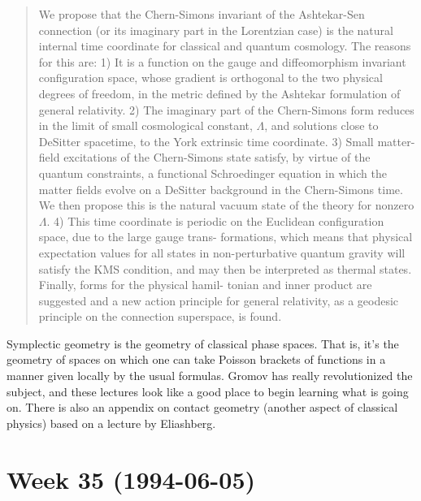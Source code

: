 \documentclass{article}
\def\tightlist{}
\renewcommand{\texttt}[1]{%
  \begingroup
  \ttfamily
  \begingroup\lccode`~=`/\lowercase{\endgroup\def~}{/\discretionary{}{}{}}%
  \begingroup\lccode`~=`[\lowercase{\endgroup\def~}{[\discretionary{}{}{}}%
  \begingroup\lccode`~=`.\lowercase{\endgroup\def~}{.\discretionary{}{}{}}%
  \catcode`/=\active\catcode`[=\active\catcode`.=\active
  \scantokens{#1\noexpand}%
  \endgroup
}
\begin{document}
\begin{quote}
We propose that the Chern-Simons invariant of the Ashtekar-Sen
connection (or its imaginary part in the Lorentzian case) is the natural
internal time coordinate for classical and quantum cosmology. The
reasons for this are: 1) It is a function on the gauge and
diffeomorphism invariant configuration space, whose gradient is
orthogonal to the two physical degrees of freedom, in the metric defined
by the Ashtekar formulation of general relativity. 2) The imaginary part
of the Chern-Simons form reduces in the limit of small cosmological
constant, \(\Lambda\), and solutions close to DeSitter spacetime, to the
York extrinsic time coordinate. 3) Small matter-field excitations of the
Chern-Simons state satisfy, by virtue of the quantum constraints, a
functional Schroedinger equation in which the matter fields evolve on a
DeSitter background in the Chern-Simons time. We then propose this is
the natural vacuum state of the theory for nonzero \(\Lambda\). 4) This
time coordinate is periodic on the Euclidean configuration space, due to
the large gauge trans- formations, which means that physical expectation
values for all states in non-perturbative quantum gravity will satisfy
the KMS condition, and may then be interpreted as thermal states.
Finally, forms for the physical hamil- tonian and inner product are
suggested and a new action principle for general relativity, as a
geodesic principle on the connection superspace, is found.
\end{quote}


Symplectic geometry is the geometry of classical phase spaces. That is,
it's the geometry of spaces on which one can take Poisson brackets of
functions in a manner given locally by the usual formulas. Gromov has
really revolutionized the subject, and these lectures look like a good
place to begin learning what is going on. There is also an appendix on
contact geometry (another aspect of classical physics) based on a
lecture by Eliashberg.
\hypertarget{week-35-1994-06-05}{%
\section{Week 35 (1994-06-05)}\label{week-35-1994-06-05}}
\end{document}
